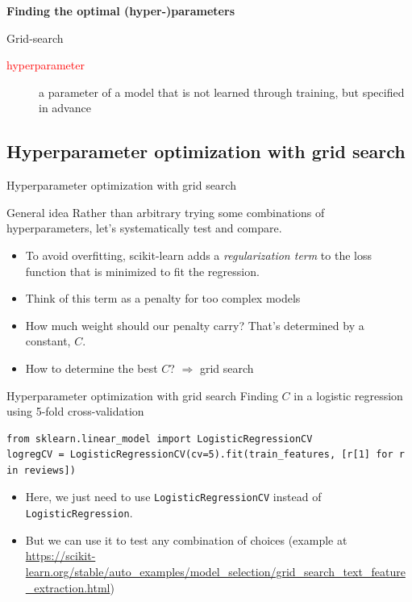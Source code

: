 \documentclass{beamer}
\begin{document}
\begin{frame}[plain]
\vspace{2cm}
\textbf{Finding the optimal (hyper-)parameters}

Grid-search
\vspace{2cm}

{\footnotesize 
\begin{description}
	\item[\textcolor{red}{hyperparameter}] a parameter of a model that is not learned through training, but specified in advance
\end{description}
}
\end{frame}



\subsection{Hyperparameter optimization with grid search}

\begin{frame}{Hyperparameter optimization with grid search}
\begin{block}{General idea}
	Rather than arbitrary trying some combinations of hyperparameters, let's systematically test and compare.
\end{block}

\pause

\begin{example}
	\begin{itemize}[<+->]
		\item To avoid overfitting, scikit-learn adds a \emph{regularization term} to the loss function that is minimized to fit the regression.
		\item Think of this term as a penalty for too complex models
		\item How much weight should our penalty carry? That's determined by a constant, $C$.
		\item How to determine the best $C$? $\Rightarrow$ grid search 
	\end{itemize}
\end{example}
\end{frame}


\begin{frame}[fragile]{Hyperparameter optimization with grid search}
Finding $C$ in a logistic regression using 5-fold cross-validation
\begin{lstlisting}
from sklearn.linear_model import LogisticRegressionCV
logregCV = LogisticRegressionCV(cv=5).fit(train_features, [r[1] for r in reviews])
\end{lstlisting}
\pause 

\begin{itemize}[<+->]
	\item Here, we just need to use \texttt{LogisticRegressionCV} instead of \texttt{LogisticRegression}. 
	\item But we can use it to test any combination of choices (example at \url{https://scikit-learn.org/stable/auto\_examples/model\_selection/grid\_search_text\_feature\_extraction.html})
\end{itemize}

\end{frame}
\end{document}
